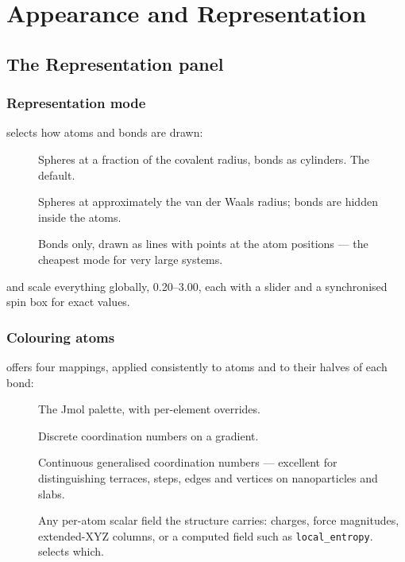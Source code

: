 \chapter{Appearance and Representation}
\label{ch:appearance}

\section{The Representation panel}

\subsection{Representation mode}

 selects how atoms and bonds are drawn:

\begin{description}
  \item[] Spheres at a fraction of the covalent radius,
    bonds as cylinders. The default.
  \item[] Spheres at approximately the van der
    Waals radius; bonds are hidden inside the atoms.
  \item[] Bonds only, drawn as lines with points at the atom
    positions --- the cheapest mode for very large systems.
\end{description}

 and  scale everything globally, 0.20--3.00,
each with a slider and a synchronised spin box for exact values.

\subsection{Colouring atoms}
\label{sec:color-modes}

 offers four mappings, applied consistently to atoms and to
their halves of each bond:

\begin{description}
  \item[] The Jmol palette, with per-element overrides.
  \item[] Discrete coordination numbers on a
    gradient.
  \item[] Continuous generalised coordination
    numbers --- excellent for distinguishing terraces, steps, edges and
    vertices on nanoparticles and slabs.
  \item[] Any per-atom scalar field the structure
    carries: charges, force magnitudes, extended-XYZ columns, or a computed
    field such as \texttt{local\_entropy}.  selects which.
\end{description}

